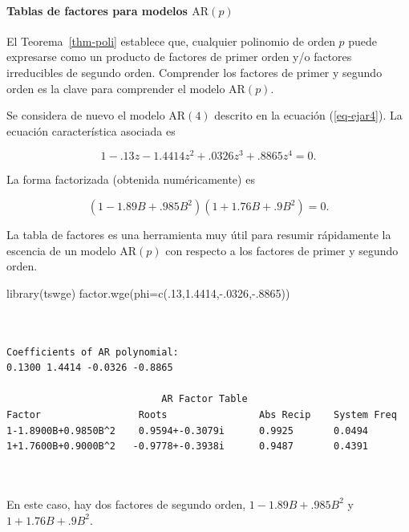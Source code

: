 \documentclass[
  us-letterpaper,
]{scrreprt}
\let\oldparagraph\paragraph
\renewcommand{\paragraph}[1]{\oldparagraph{#1}\mbox{}}
\newenvironment{Shaded}{\begin{snugshade}}{\end{snugshade}}
\newcommand{\AttributeTok}[1]{\textcolor[rgb]{0.40,0.45,0.13}{#1}}
\newcommand{\DecValTok}[1]{\textcolor[rgb]{0.68,0.00,0.00}{#1}}
\newcommand{\FloatTok}[1]{\textcolor[rgb]{0.68,0.00,0.00}{#1}}
\newcommand{\FunctionTok}[1]{\textcolor[rgb]{0.28,0.35,0.67}{#1}}
\newcommand{\NormalTok}[1]{\textcolor[rgb]{0.00,0.23,0.31}{#1}}
\newcommand{\SpecialCharTok}[1]{\textcolor[rgb]{0.37,0.37,0.37}{#1}}
\theoremstyle{plain}
\theoremstyle{definition}
\theoremstyle{definition}
\theoremstyle{plain}
\theoremstyle{remark}
\begin{document}
\paragraph{\texorpdfstring{Tablas de factores para modelos
\(\mathrm{AR}(p)\)}{Tablas de factores para modelos \textbackslash mathrm\{AR\}(p)}}\label{tablas-de-factores-para-modelos-mathrmarp}

El Teorema~\ref{thm-poli} establece que, cualquier polinomio de orden
\(p\) puede expresarse como un producto de factores de primer orden y/o
factores irreducibles de segundo orden. Comprender los factores de
primer y segundo orden es la clave para comprender el modelo
\(\mathrm{AR}(p)\).

\begin{tcolorbox}[enhanced jigsaw, bottomtitle=1mm, coltitle=black, breakable, leftrule=.75mm, left=2mm, rightrule=.15mm, titlerule=0mm, toprule=.15mm, toptitle=1mm, colback=white, colframe=quarto-callout-caution-color-frame, title={Ejemplo~\ref{exm-ar4} (Continuación\ldots)}, colbacktitle=quarto-callout-caution-color!10!white, arc=.35mm, bottomrule=.15mm, opacitybacktitle=0.6, opacityback=0]

Se considera de nuevo el modelo \(\mathrm{AR}(4)\) descrito en la
ecuación (\ref{eq-ejar4}). La ecuación característica asociada es

\[
1-.13z-1.4414z^2+.0326z^3+.8865z^4=0.
\]

La forma factorizada (obtenida numéricamente) es

\[
(1-1.89B+.985B^2)(1+1.76B+.9B^2)=0.
\]

La tabla de factores es una herramienta muy útil para resumir
rápidamente la escencia de un modelo \(\mathrm{AR}(p)\) con respecto a
los factores de primer y segundo orden.

\begin{Shaded}
\begin{Highlighting}[]
\FunctionTok{library}\NormalTok{(tswge)}
\FunctionTok{factor.wge}\NormalTok{(}\AttributeTok{phi=}\FunctionTok{c}\NormalTok{(.}\DecValTok{13}\NormalTok{,}\FloatTok{1.4414}\NormalTok{,}\SpecialCharTok{{-}}\NormalTok{.}\DecValTok{0326}\NormalTok{,}\SpecialCharTok{{-}}\NormalTok{.}\DecValTok{8865}\NormalTok{))}
\end{Highlighting}
\end{Shaded}

\begin{verbatim}
  
  
Coefficients of AR polynomial:  
0.1300 1.4414 -0.0326 -0.8865 

                           AR Factor Table 
Factor                 Roots                Abs Recip    System Freq 
1-1.8900B+0.9850B^2    0.9594+-0.3079i      0.9925       0.0494
1+1.7600B+0.9000B^2   -0.9778+-0.3938i      0.9487       0.4391
  
  
\end{verbatim}

En este caso, hay dos factores de segundo orden, \(1-1.89B+.985B^2\) y
\(1+1.76B+.9B^2\).

\end{tcolorbox}
\end{document}

